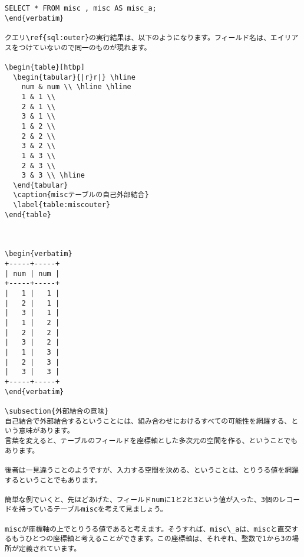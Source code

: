 \begin{lstlisting}[caption=自己結合の外部結合の例,label=sql:outer]
SELECT * FROM misc , misc AS misc_a;
\end{verbatim}

クエリ\ref{sql:outer}の実行結果は、以下のようになります。フィールド名は、エイリアスをつけていないので同一のものが現れます。

\begin{table}[htbp]
  \begin{tabular}{|r}r|} \hline
    num & num \\ \hline \hline  
    1 & 1 \\
    2 & 1 \\
    3 & 1 \\ 
    1 & 2 \\
    2 & 2 \\
    3 & 2 \\
    1 & 3 \\
    2 & 3 \\
    3 & 3 \\ \hline
  \end{tabular}
  \caption{miscテーブルの自己外部結合}
  \label{table:miscouter}
\end{table}



\begin{verbatim}
+-----+-----+
| num | num |
+-----+-----+
|   1 |   1 |
|   2 |   1 |
|   3 |   1 |
|   1 |   2 |
|   2 |   2 |
|   3 |   2 |
|   1 |   3 |
|   2 |   3 |
|   3 |   3 |
+-----+-----+
\end{verbatim}

\subsection{外部結合の意味}
自己結合で外部結合するということには、組み合わせにおけるすべての可能性を網羅する、という意味があります。
言葉を変えると、テーブルのフィールドを座標軸とした多次元の空間を作る、ということでもあります。

後者は一見違うことのようですが、入力する空間を決める、ということは、とりうる値を網羅するということでもあります。

簡単な例でいくと、先ほどあげた、フィールドnumに1と2と3という値が入った、3個のレコードを持っているテーブルmiscを考えて見ましょう。

miscが座標軸の上でとりうる値であると考えます。そうすれば、misc\_aは、miscと直交するもうひとつの座標軸と考えることができます。この座標軸は、それぞれ、整数で1から3の場所が定義されています。


\end{lstlisting}
